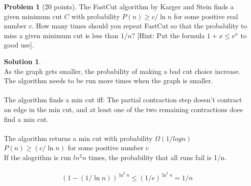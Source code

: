 \documentclass{article}
\theoremstyle{definition}
\newtheorem{problem}{Problem}
\newtheorem*{solution}{Solution}
\begin{document}
\begin{problem}[20 points] 
The FastCut algorithm by Karger and Stein finds a given minimum cut
  $C$ with probability $P(n) \ge c/\ln n$ for some positive real
  number $c$. How many times should you repeat FastCut so that the probability
  to miss a given minimum cut is less than $1/n$? [Hint: Put the
  formula $1+x\le e^x$ to good use]. 
\end{problem}
\begin{solution} \\
As the graph gets smaller, the probability of making a bad cut choice increase. The algorithm needs to be run more times when the graph is smaller. \\
\\
The algorithm finds a min cut iff: The partial contraction step doesn't contract an edge in the min cut, and at least one of the two remaining contractions does find a min cut.\\
\\
The algorithm returns a min cut with probability $\Omega (1 / log n)$\\
$P(n) \geq ( c/ \ln n )$ for some positive number c\\
If the alogrithm is run $ln^2 n$ times, the probability that all runs fail is 1/n.\\
\\
$$(1-(1/\ln n))^{\ln^2 n} \leq (1/e)^{\ln^2 n} = 1/n $$

\end{solution}









\goodbreak
\checklist
\end{document}
